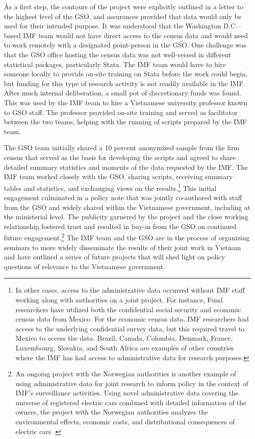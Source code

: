 \documentclass[
]{book}
\begin{document}
As a first step, the contours of the project were explicitly outlined in a letter to the highest level of the GSO, and assurances provided that data would only be used for their intended purpose. It was understood that the Washington D.C.--based IMF team would not have direct access to the census data and would need to work remotely with a designated point-person in the GSO. One challenge was that the GSO office hosting the census data was not well-versed in different statistical packages, particularly Stata. The IMF team would have to hire someone locally to provide on-site training on Stata before the work could begin, but funding for this type of research activity is not readily available in the IMF. After much internal deliberation, a small pot of discretionary funds was found. This was used by the IMF team to hire a Vietnamese university professor known to GSO staff. The professor provided on-site training and served as facilitator between the two teams, helping with the running of scripts prepared by the IMF team.

The GSO team initially shared a 10 percent anonymized sample from the firm census that served as the basis for developing the scripts and agreed to share detailed summary statistics and moments of the data requested by the IMF. The IMF team worked closely with the GSO, sharing scripts, receiving summary tables and statistics, and exchanging views on the results.\footnote{In other cases, access to the administrative data occurred without IMF staff working along with authorities on a joint project. For instance, Fund researchers have utilized both the confidential social security and economic census data from Mexico. For the economic census data, IMF researchers had access to the underlying confidential survey data, but this required travel to Mexico to access the data. Brazil, Canada, Colombia, Denmark, France, Luxembourg, Slovakia, and South Africa are examples of other countries where the IMF has had access to administrative data for research purposes.} This initial engagement culminated in a policy note that was jointly co-authored with staff from the GSO and widely shared within the Vietnamese government, including at the ministerial level. The publicity garnered by the project and the close working relationship fostered trust and resulted in buy-in from the GSO on continued future engagement.\footnote{An ongoing project with the Norwegian authorities is another example of using administrative data for joint research to inform policy in the context of IMF's surveillance activities. Using novel administrative data covering the universe of registered electric cars combined with detailed information of the owners, the project with the Norwegian authorities analyzes the environmental effects, economic costs, and distributional consequences of electric cars \citep{holtsmark2020}.} The IMF team and the GSO are in the process of organizing seminars to more widely disseminate the results of their joint work in Vietnam and have outlined a series of future projects that will shed light on policy questions of relevance to the Vietnamese government.
\end{document}
